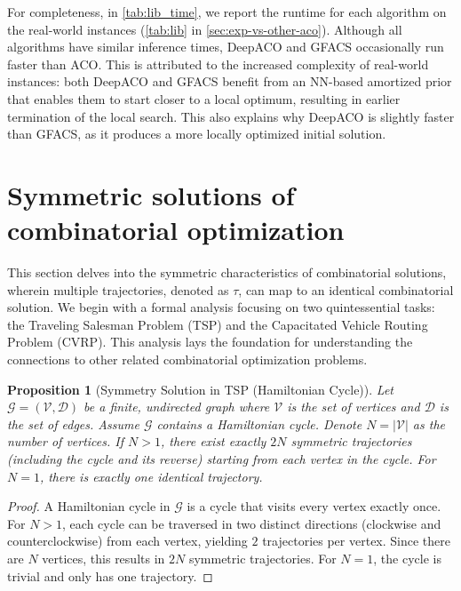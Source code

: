 \documentclass[twoside]{article}
\theoremstyle{plain}
\newtheorem{proposition}[theorem]{Proposition}
\theoremstyle{definition}
\theoremstyle{remark}
\begin{document}
For completeness, in \cref{tab:lib_time}, we report the runtime for each algorithm on the real-world instances (\cref{tab:lib} in \cref{sec:exp-vs-other-aco}). Although all algorithms have similar inference times, DeepACO and GFACS occasionally run faster than ACO. This is attributed to the increased complexity of real-world instances: both DeepACO and GFACS benefit from an NN-based amortized prior that enables them to start closer to a local optimum, resulting in earlier termination of the local search. This also explains why DeepACO is slightly faster than GFACS, as it produces a more locally optimized initial solution.


\section{Symmetric solutions of combinatorial optimization}\label{app:symmetric}

This section delves into the symmetric characteristics of combinatorial solutions, wherein multiple trajectories, denoted as \( \tau \), can map to an identical combinatorial solution. We begin with a formal analysis focusing on two quintessential tasks: the Traveling Salesman Problem (TSP) and the Capacitated Vehicle Routing Problem (CVRP). This analysis lays the foundation for understanding the connections to other related combinatorial optimization problems.

\begin{proposition}[Symmetry Solution in TSP (Hamiltonian Cycle)]
Let \( \mathcal{G} = (\mathcal{V}, \mathcal{D}) \) be a finite, undirected graph where \( \mathcal{V} \) is the set of vertices and \( \mathcal{D} \) is the set of edges. Assume \( \mathcal{G} \) contains a Hamiltonian cycle. Denote \( N = |\mathcal{V}| \) as the number of vertices. If \( N > 1 \), there exist exactly \( 2N \) symmetric trajectories (including the cycle and its reverse) starting from each vertex in the cycle. For \( N = 1 \), there is exactly one identical trajectory.
\end{proposition}

\begin{proof}
A Hamiltonian cycle in \( \mathcal{G} \) is a cycle that visits every vertex exactly once. For \( N > 1 \), each cycle can be traversed in two distinct directions (clockwise and counterclockwise) from each vertex, yielding \( 2 \) trajectories per vertex. Since there are \( N \) vertices, this results in \( 2N \) symmetric trajectories. For \( N = 1 \), the cycle is trivial and only has one trajectory.
\end{proof}
\end{document}
